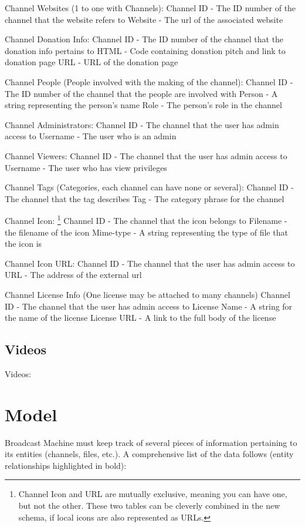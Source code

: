\documentclass[a4paper,12pt]{report}
\begin{document}
Channel Websites (1 to one with Channels):
	Channel ID - The ID number of the channel that the website refers to
	Website - The url of the associated website

Channel Donation Info:
	Channel ID - The ID number of the channel that the donation info pertains to
	HTML - Code containing donation pitch and link to donation page
	URL - URL of the donation page

Channel People (People involved with the making of the channel):
	Channel ID - The ID number of the channel that the people are involved with
	Person - A string representing the person's name
	Role - The person's role in the channel

Channel Administrators:
	Channel ID - The channel that the user has admin access to
	Username - The user who is an admin

Channel Viewers:
	Channel ID - The channel that the user has admin access to
	Username - The user who has view privileges

Channel Tags (Categories, each channel can have none or several):
	Channel ID - The channel that the tag describes
	Tag - The category phrase for the channel

Channel Icon:
\footnote{Channel Icon and URL are mutually exclusive, meaning you can have one, but not the other. These two tables can be cleverly combined in the new schema, if local icons are also represented as URLs.}
	Channel ID - The channel that the icon belongs to
	Filename - the filename of the icon
	Mime-type - A string representing the type of file that the icon is

Channel Icon URL:
	Channel ID - The channel that the user has admin access to
	URL - The address of the external url

Channel License Info (One license may be attached to many channels)
	Channel ID - The channel that the user has admin access to
	License Name - A string for the name of the license
	License URL - A link to the full body of the license

\subsection{Videos}
Videos:


\section{Model}
Broadcast Machine must keep track of  several pieces of information pertaining to its entities (channels, files, etc.). 
A comprehensive list of the data follows (entity relationships highlighted in bold):
\end{document}
